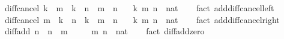 \begin{isabellebody}
\endisatagproof
{\isafoldproof}%
%
\isadelimproof
\isanewline
%
\endisadelimproof
\isanewline
{}\isamarkupfalse%
\ diff{\isacharunderscore}{\kern0pt}cancel{\isacharcolon}{\kern0pt}\ {\isachardoublequoteopen}{\isacharparenleft}{\kern0pt}k\ {\isacharplus}{\kern0pt}\ m{\isacharparenright}{\kern0pt}\ {\isacharminus}{\kern0pt}\ {\isacharparenleft}{\kern0pt}k\ {\isacharplus}{\kern0pt}\ n{\isacharparenright}{\kern0pt}\ {\isacharequal}{\kern0pt}\ m\ {\isacharminus}{\kern0pt}\ n{\isachardoublequoteclose}\isanewline
\ \ \ k\ m\ n\ {\isacharcolon}{\kern0pt}{\isacharcolon}{\kern0pt}\ nat\isanewline
%
\isadelimproof
\ \ %
\endisadelimproof
%
\isatagproof
{}\isamarkupfalse%
\ {\isacharparenleft}{\kern0pt}fact\ add{\isacharunderscore}{\kern0pt}diff{\isacharunderscore}{\kern0pt}cancel{\isacharunderscore}{\kern0pt}left{\isacharparenright}{\kern0pt}%
\endisatagproof
{\isafoldproof}%
%
\isadelimproof
\isanewline
%
\endisadelimproof
\isanewline
{}\isamarkupfalse%
\ diff{\isacharunderscore}{\kern0pt}cancel{}{\isacharcolon}{\kern0pt}\ {\isachardoublequoteopen}{\isacharparenleft}{\kern0pt}m\ {\isacharplus}{\kern0pt}\ k{\isacharparenright}{\kern0pt}\ {\isacharminus}{\kern0pt}\ {\isacharparenleft}{\kern0pt}n\ {\isacharplus}{\kern0pt}\ k{\isacharparenright}{\kern0pt}\ {\isacharequal}{\kern0pt}\ m\ {\isacharminus}{\kern0pt}\ n{\isachardoublequoteclose}\isanewline
\ \ \ k\ m\ n\ {\isacharcolon}{\kern0pt}{\isacharcolon}{\kern0pt}\ nat\isanewline
%
\isadelimproof
\ \ %
\endisadelimproof
%
\isatagproof
{}\isamarkupfalse%
\ {\isacharparenleft}{\kern0pt}fact\ add{\isacharunderscore}{\kern0pt}diff{\isacharunderscore}{\kern0pt}cancel{\isacharunderscore}{\kern0pt}right{\isacharparenright}{\kern0pt}%
\endisatagproof
{\isafoldproof}%
%
\isadelimproof
\isanewline
%
\endisadelimproof
\isanewline
{}\isamarkupfalse%
\ diff{\isacharunderscore}{\kern0pt}add{\isacharunderscore}{\kern0pt}{}{\isacharcolon}{\kern0pt}\ {\isachardoublequoteopen}n\ {\isacharminus}{\kern0pt}\ {\isacharparenleft}{\kern0pt}n\ {\isacharplus}{\kern0pt}\ m{\isacharparenright}{\kern0pt}\ {\isacharequal}{\kern0pt}\ {}{\isachardoublequoteclose}\isanewline
\ \ \ m\ n\ {\isacharcolon}{\kern0pt}{\isacharcolon}{\kern0pt}\ nat\isanewline
%
\isadelimproof
\ \ %
\endisadelimproof
%
\isatagproof
{}\isamarkupfalse%
\ {\isacharparenleft}{\kern0pt}fact\ diff{\isacharunderscore}{\kern0pt}add{\isacharunderscore}{\kern0pt}zero{\isacharparenright}{\kern0pt}%
\endisatagproof
{\isafoldproof}%

\end{isabellebody}
